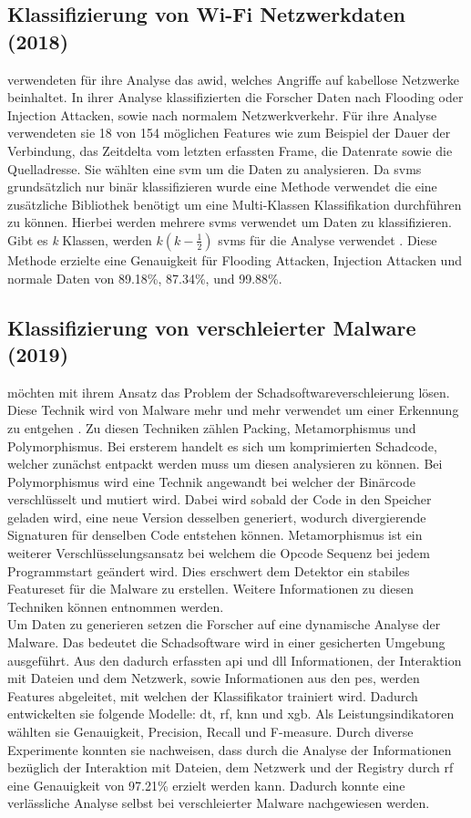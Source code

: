 \documentclass[
    12pt, %
    DIV10,
    ngerman, %
    a4paper, %
    oneside, %
    titlepage, %
    parskip=half, %
    headings=normal, %
    listof=totoc, %
    bibliography=totoc, %
    index=totoc, %
    captions=tableheading, %
    final %
]{scrreprt}
\begin{document}
\subsection{Klassifizierung von Wi-Fi Netzwerkdaten (2018)}
\textcite{Qin2018} verwendeten für ihre Analyse das \ac{awid}, welches Angriffe auf kabellose Netzwerke beinhaltet. In ihrer Analyse klassifizierten die Forscher Daten nach Flooding oder Injection Attacken, sowie nach normalem Netzwerkverkehr. Für ihre Analyse verwendeten sie 18 von 154 möglichen Features wie zum Beispiel der Dauer der Verbindung, das Zeitdelta vom letzten erfassten Frame, die Datenrate sowie die Quelladresse. Sie wählten eine \ac{svm} um die Daten zu analysieren. Da \ac{svms} grundsätzlich nur binär klassifizieren wurde eine Methode verwendet die eine zusätzliche Bibliothek benötigt um eine Multi-Klassen Klassifikation durchführen zu können. Hierbei werden mehrere \ac{svms} verwendet um Daten zu klassifizieren. Gibt es \emph{k} Klassen, werden \(k(k-\frac{1}{2})\) \ac{svms} für die Analyse verwendet \parencite{Qin2018}. Diese Methode erzielte eine Genauigkeit für Flooding Attacken, Injection Attacken und normale Daten von 89.18\%, 87.34\%, und
99.88\%.
%
%
\subsection{Klassifizierung von verschleierter Malware (2019)}
\textcite{Han2019} möchten mit ihrem Ansatz das Problem der Schadsoftwareverschleierung lösen. Diese Technik wird von Malware mehr und mehr verwendet um einer Erkennung zu entgehen \parencite{li2016facial}. Zu diesen Techniken zählen Packing, Metamorphismus und Polymorphismus. Bei ersterem handelt es sich um komprimierten Schadcode, welcher zunächst entpackt werden muss um diesen analysieren zu können. Bei Polymorphismus wird eine Technik angewandt bei welcher der Binärcode verschlüsselt und mutiert wird. Dabei wird sobald der Code in den Speicher geladen wird, eine neue Version desselben generiert, wodurch divergierende Signaturen für denselben Code entstehen können. Metamorphismus ist ein weiterer Verschlüsselungsansatz bei welchem die Opcode Sequenz bei jedem Programmstart geändert wird. Dies erschwert dem Detektor ein stabiles Featureset für die Malware zu erstellen. Weitere Informationen zu diesen Techniken können \textcite{he2017model} entnommen werden.\\
Um Daten zu generieren setzen die Forscher auf eine dynamische Analyse der Malware. Das bedeutet die Schadsoftware wird in einer gesicherten Umgebung ausgeführt. Aus den dadurch erfassten \ac{api} und \ac{dll} Informationen, der Interaktion mit Dateien und dem Netzwerk, sowie Informationen aus den \ac{pes}, werden Features abgeleitet, mit welchen der Klassifikator trainiert wird. Dadurch entwickelten sie folgende Modelle: \ac{dt}, \ac{rf}, \ac{knn} und \ac{xgb}. Als Leistungsindikatoren wählten sie Genauigkeit, Precision, Recall und F-measure. Durch diverse Experimente konnten sie nachweisen, dass durch die Analyse der Informationen bezüglich der Interaktion mit Dateien, dem Netzwerk und der Registry durch \ac{rf} eine Genauigkeit von 97.21\% erzielt werden kann. Dadurch konnte eine verlässliche Analyse selbst bei verschleierter Malware nachgewiesen werden. 
\end{document}
